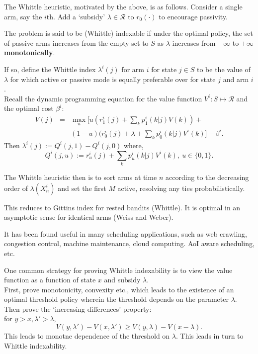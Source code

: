 \documentclass{slides}
\newcommand{\R}{\mathcal{R}}
\begin{document}
{The Whittle heuristic, motivated by the above, is as follows. Consider a single arm, say the $i$th. Add a `subsidy' $\lambda \in \R$ to $r_0(\cdot)$ to encourage passivity. 

The problem is said to be {\color{red} (Whittle) indexable} if under the optimal policy, the set of passive arms increases from the empty set to $S$ as $\lambda$ increases from $-\infty$ to $+\infty$ \\\textbf{monotonically}. 

\newpage

If so, define the {\color{red} Whittle index} $\lambda^i(j)$ for arm $i$ for state $j\in S$ to be the value of $\lambda$ for which active or passive mode is equally preferable over  for state $j$ and arm $i$. \\
Recall the dynamic programming equation for the value function $V^i: S \mapsto \R$ and the optimal cost $\beta^i$:
\begin{eqnarray*}
V(j) &=& \max_u\Big[u(r_1^i(j) + \sum_kp_1^i(k|j)V(k)) + \\
&&(1-u)(r_0^i(j) + \lambda + \sum_kp_0^i(k|j)V^i(k)\Big] - \beta^i.
\end{eqnarray*}
Then $\lambda^i(j) := Q^i(j,1) - Q^i(j,0)$ where,
$$Q^i(j,u) := r^i_u(j) + \sum_kp^i_u(k|j)V^i(k), \ u\in\{0,1\}.$$

\newpage

The Whittle heuristic then is to sort arms at time $n$ according to the decreasing order of $\lambda(X^i_n)$ and set the first $M$ active, resolving any ties probabilistically.

This reduces to Gittins index for rested bandits (Whittle). It is optimal in an asymptotic sense for identical arms (Weiss and Weber). 

It has been found useful in many scheduling applications, such as web crawling, congestion control, machine maintenance, cloud computing. AoI aware scheduling, etc.

\newpage

One common strategy for proving Whittle indexability is to view the value function as a function of state $x$ and subsidy $\lambda$.\\
First, prove monotonicity, convexity etc., which leads to the existence of an optimal threshold policy wherein the threshold depends on the parameter $\lambda$.\\
Then prove  the `increasing differences' property:\\ for $y>x, \lambda'>\lambda$,
$$V(y,\lambda') - V(x,\lambda') \geq V(y,\lambda) - V(x-\lambda).$$
This leads to monotne dependence of the threshold on $\lambda$. This leads in turn to Whittle indexability.


}
\end{document}
